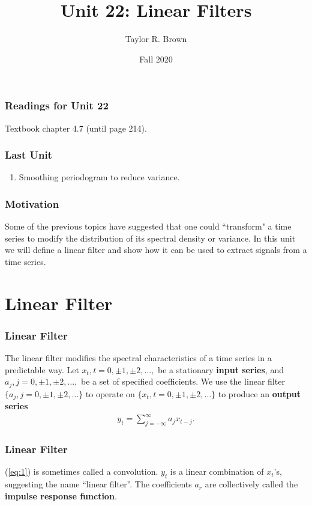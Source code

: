 \documentclass[%
xcolor=pdftex]{beamer}
\title{Unit 22: Linear Filters}
\author[STAT 5170: Applied Time Series, Unit 24]{Taylor R. Brown}
\institute{Department of Statistics, University of Virginia}
\date{Fall 2020}
\begin{document}
\frame{\titlepage}


\begin{frame}
\frametitle{Readings for Unit 22}

Textbook chapter 4.7 (until page 214).

\end{frame}


\begin{frame}
\frametitle{Last Unit}
\begin{enumerate}
\item Smoothing periodogram to reduce variance.
\end{enumerate}
\end{frame}

\begin{frame}
\frametitle{Motivation}

Some of the previous topics have suggested that one could ``transform" a time series to modify the distribution of its spectral density or variance. In this unit we will define a linear filter and show how it can be used to extract signals from a time series.


\end{frame}

\section{Linear Filter}
\frame{\tableofcontents[currentsection]}

\begin{frame}
\frametitle{Linear Filter}

The linear filter modifies the spectral characteristics of a time series in a predictable way. Let  $x_t,t=0,\pm 1,\pm 2,\ldots,$ be a stationary \textbf{input
series}, and $a_j,j=0,\pm 1,\pm 2,\ldots,$ be a set of specified
coefficients. We use the linear filter $\{a_j,j=0,\pm 1, \pm
2,\ldots\}$ to operate on $\{x_t,t=0,\pm 1, \pm 2,\ldots\}$ to
produce an \textbf{output series}
\begin{eqnarray}\label{eq:1}
y_t = \sum^\infty_{j=-\infty} a_j x_{t-j}.
\end{eqnarray}



\end{frame}

\begin{frame}
\frametitle{Linear Filter}

(\ref{eq:1}) is sometimes called a convolution.  $y_t$ is a linear combination of $x_t$'s, suggesting the
name ``linear filter''. The coefficients $a_r$ are collectively
called the {\bf impulse response function}.

\end{frame}
\end{document}

